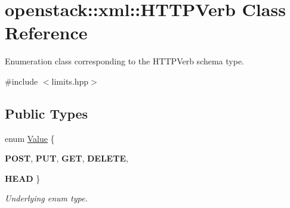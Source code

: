 \hypertarget{classopenstack_1_1xml_1_1HTTPVerb}{
\section{openstack::xml::HTTPVerb Class Reference}
\label{classopenstack_1_1xml_1_1HTTPVerb}
}


Enumeration class corresponding to the HTTPVerb schema type.  




{\ttfamily \#include $<$limits.hpp$>$}

\subsection*{Public Types}
\begin{DoxyCompactItemize}
\item 
enum \hyperlink{classopenstack_1_1xml_1_1HTTPVerb_a04bf58bd0d545f256c97c10787853217}{Value} \{ \par
{\bfseries POST}, 
{\bfseries PUT}, 
{\bfseries GET}, 
{\bfseries DELETE}, 
\par
{\bfseries HEAD}
 \}
\begin{DoxyCompactList}\small\item\em Underlying enum type. \item\end{DoxyCompactList}\end{DoxyCompactItemize}
